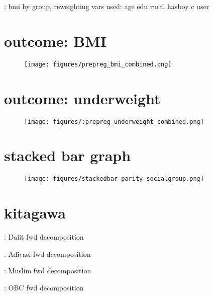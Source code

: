 \documentclass{article}
\begin{document}
\begin{table}[H]
    \centering
    \footnotesize %
    \caption{: bmi by group, reweighting vars used: age edu rural hasboy c user}
    \label{tab:sumstat}
\end{table}



\section{outcome: BMI}
\begin{figure}[H]
    \centering
    \texttt{[image: figures/prepreg\_bmi\_combined.png]}
\end{figure}

\section{outcome: underweight}
\begin{figure}[H]
    \centering
    \texttt{[image: figures/:prepreg\_underweight\_combined.png]}
\end{figure}

\section{stacked bar graph}
\begin{figure}[H]
    \centering
    \texttt{[image: figures/stackedbar\_parity\_socialgroup.png]}
\end{figure}


\newpage
\section{kitagawa}



\begin{table}[H]
    \centering
    \footnotesize %
    \caption{: Dalit fwd decomposition}
    \label{tab:sumstat}
\end{table}

\begin{table}[H]
    \centering
    \footnotesize %
    \caption{: Adivasi fwd decomposition}
    \label{tab:sumstat}
\end{table}



\begin{table}[H]
    \centering
    \footnotesize %
    \caption{: Muslim fwd decomposition}
    \label{tab:sumstat}
\end{table}

\begin{table}[H]
    \centering
    \footnotesize %
    \caption{: OBC fwd decomposition}
    \label{tab:sumstat}
\end{table}
\end{document}
